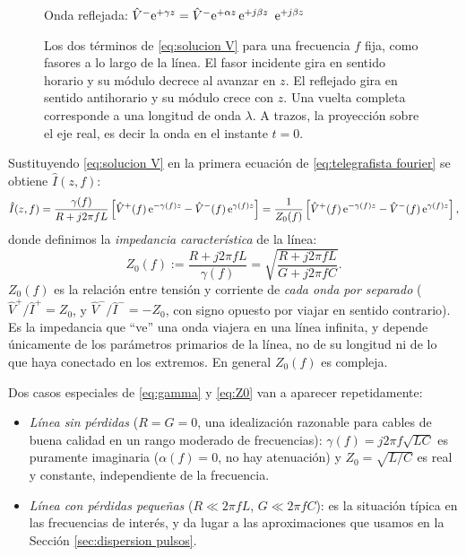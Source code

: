\begin{figure}
\begin{center}
        \vspace{2mm}
          {Onda reflejada: $\hat V^- \mathrm{e}^{+\gamma z} = \hat V^- \mathrm{e}^{+\alpha z}\, \mathrm{e}^{+j\beta z}$}%
          {$\mathrm{e}^{+j\beta z}$}
    \end{center}
    \caption{Los dos términos de \eqref{eq:solucion V} para una frecuencia $f$ fija, como fasores a lo largo de la línea. El fasor incidente gira en sentido horario y su módulo decrece al avanzar en $z$. El reflejado gira en sentido antihorario y su módulo crece con $z$. Una vuelta completa corresponde a una longitud de onda $\lambda$. A trazos, la proyección sobre el eje real, es decir la onda en el instante $t=0$.}\label{fig:fasor 3d}
\end{figure}

Sustituyendo \eqref{eq:solucion V} en la primera ecuación de \eqref{eq:telegrafista fourier} se obtiene $\hat I(z,f)$:
\begin{equation}\label{eq:solucion I}
    \hat{I}(z,f) = \frac{\gamma(f)}{R+j2\pi f L}\left[\hat{V}^+(f)\, \mathrm{e}^{-\gamma(f) z} - \hat{V}^-(f)\, \mathrm{e}^{\gamma(f) z}\right] = \frac{1}{Z_0(f)}\left[\hat{V}^+(f)\, \mathrm{e}^{-\gamma(f) z} - \hat{V}^-(f)\, \mathrm{e}^{\gamma(f) z}\right],
\end{equation}
donde definimos la \emph{impedancia característica} de la línea:
\begin{equation}\label{eq:Z0}
    Z_0(f) := \frac{R+j2\pi f L}{\gamma(f)} = \sqrt{\frac{R+j2\pi f L}{G+j2\pi f C}}.
\end{equation}
$Z_0(f)$ es la relación entre tensión y corriente de \emph{cada onda por separado} ($\hat V^+/\hat I^+ = Z_0$, y $\hat V^-/\hat I^- = -Z_0$, con signo opuesto por viajar en sentido contrario). Es la impedancia que ``ve'' una onda viajera en una línea infinita, y depende únicamente de los parámetros primarios de la línea, no de su longitud ni de lo que haya conectado en los extremos. En general $Z_0(f)$ es compleja.

\begin{remark}
Dos casos especiales de \eqref{eq:gamma} y \eqref{eq:Z0} van a aparecer repetidamente:
\begin{itemize}
    \item \emph{Línea sin pérdidas} ($R=G=0$, una idealización razonable para cables de buena calidad en un rango moderado de frecuencias): $\gamma(f)=j2\pi f\sqrt{LC}$ es puramente imaginaria ($\alpha(f)=0$, no hay atenuación) y $Z_0=\sqrt{L/C}$ es real y constante, independiente de la frecuencia.
    \item \emph{Línea con pérdidas pequeñas} ($R\ll 2\pi f L$, $G \ll 2\pi f C$): es la situación típica en las frecuencias de interés, y da lugar a las aproximaciones que usamos en la Sección \ref{sec:dispersion pulsos}.
\end{itemize}
\end{remark}

